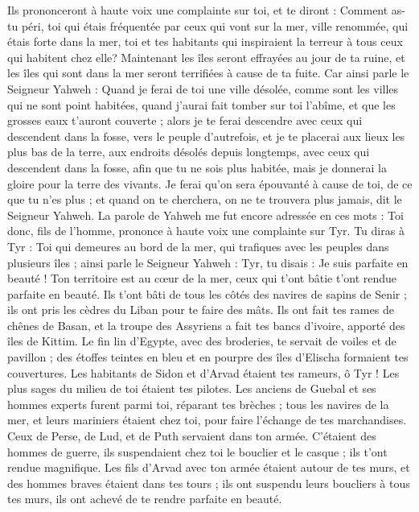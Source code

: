 \begin{multicols}{2}
Ils prononceront à haute voix une complainte sur toi, et te diront : Comment as-tu péri, toi qui étais fréquentée par ceux qui vont sur la mer, ville renommée, qui étais forte dans la mer, toi et tes habitants qui inspiraient la terreur à tous ceux qui habitent chez elle?
Maintenant les îles seront effrayées au jour de ta ruine, et les îles qui sont dans la mer seront terrifiées à cause de ta fuite.
Car ainsi parle le Seigneur Yahweh : Quand je ferai de toi une ville désolée, comme sont les villes qui ne sont point habitées, quand j'aurai fait tomber sur toi l'abîme, et que les grosses eaux t'auront couverte ;
alors je te ferai descendre avec ceux qui descendent dans la fosse, vers le peuple d'autrefois, et je te placerai aux lieux les plus bas de la terre, aux endroits désolés depuis longtemps, avec ceux qui descendent dans la fosse, afin que tu ne sois plus habitée, mais je donnerai la gloire pour la terre des vivants.
Je ferai qu'on sera épouvanté à cause de toi, de ce que tu n'es plus ; et quand on te cherchera, on ne te trouvera plus jamais, dit le Seigneur Yahweh.
\VerseOne{}La parole de Yahweh me fut encore adressée en ces mots :
Toi donc, fils de l'homme, prononce à haute voix une complainte sur Tyr.
Tu diras à Tyr : Toi qui demeures au bord de la mer, qui trafiques avec les peuples dans plusieurs îles ; ainsi parle le Seigneur Yahweh : Tyr, tu disais : Je suis parfaite en beauté !
Ton territoire est au cœur de la mer, ceux qui t'ont bâtie t'ont rendue parfaite en beauté.
Ils t'ont bâti de tous les côtés des navires de sapins de Senir ; ils ont pris les cèdres du Liban pour te faire des mâts.
Ils ont fait tes rames de chênes de Basan, et la troupe des Assyriens a fait tes bancs d'ivoire, apporté des îles de Kittim.
Le fin lin d'Egypte, avec des broderies, te servait de voiles et de pavillon ; des étoffes teintes en bleu et en pourpre des îles d'Elischa formaient tes couvertures.
Les habitants de Sidon et d'Arvad étaient tes rameurs, ô Tyr ! Les plus sages du milieu de toi étaient tes pilotes.
Les anciens de Guebal et ses hommes experts furent parmi toi, réparant tes brèches ; tous les navires de la mer, et leurs mariniers étaient chez toi, pour faire l'échange de tes marchandises.
Ceux de Perse, de Lud, et de Puth servaient dans ton armée. C'étaient des hommes de guerre, ils suspendaient chez toi le bouclier et le casque ; ils t'ont rendue magnifique.
Les fils d'Arvad avec ton armée étaient autour de tes murs, et des hommes braves étaient dans tes tours ; ils ont suspendu leurs boucliers à tous tes murs, ils ont achevé de te rendre parfaite en beauté.

\end{multicols}
